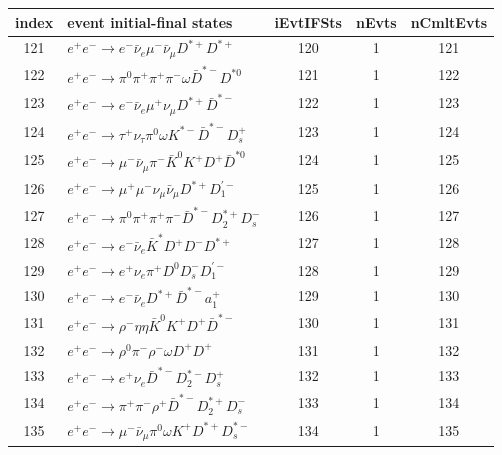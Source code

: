 \documentclass[landscape]{article}
\begin{document}
\begin{table}[htbp!]
\small
\centering
\begin{tabular}{|c|>{\centering}p{18cm}|c|c|c|}
\hline
index & event initial-final states & iEvtIFSts & nEvts & nCmltEvts \\
\hline
121 & $ e^{+} e^{-} \rightarrow e^{-} \bar{\nu}_{e} \mu^{-} \bar{\nu}_{\mu} D^{*+} D^{*+} $ & 120 & 1 & 121 \\
\hline
122 & $ e^{+} e^{-} \rightarrow \pi^{0} \pi^{+} \pi^{+} \pi^{-} \omega \bar{D}^{*-} D^{*0} $ & 121 & 1 & 122 \\
\hline
123 & $ e^{+} e^{-} \rightarrow e^{-} \bar{\nu}_{e} \mu^{+} \nu_{\mu} D^{*+} \bar{D}^{*-} $ & 122 & 1 & 123 \\
\hline
124 & $ e^{+} e^{-} \rightarrow \tau^{+} \nu_{\tau} \pi^{0} \omega K^{*-} \bar{D}^{*-} D_{s}^{+} $ & 123 & 1 & 124 \\
\hline
125 & $ e^{+} e^{-} \rightarrow \mu^{-} \bar{\nu}_{\mu} \pi^{-} \bar{K}^{0} K^{+} D^{+} \bar{D}^{*0} $ & 124 & 1 & 125 \\
\hline
126 & $ e^{+} e^{-} \rightarrow \mu^{+} \mu^{-} \nu_{\mu} \bar{\nu}_{\mu} D^{*+} D_{1}^{\prime-} $ & 125 & 1 & 126 \\
\hline
127 & $ e^{+} e^{-} \rightarrow \pi^{0} \pi^{+} \pi^{+} \pi^{-} \bar{D}^{*-} D_{2}^{*+} D_{s}^{-} $ & 126 & 1 & 127 \\
\hline
128 & $ e^{+} e^{-} \rightarrow e^{-} \bar{\nu}_{e} \bar{K}^{*} D^{+} D^{-} D^{*+} $ & 127 & 1 & 128 \\
\hline
129 & $ e^{+} e^{-} \rightarrow e^{+} \nu_{e} \pi^{+} D^{0} D_{s}^{-} D_{1}^{\prime-} $ & 128 & 1 & 129 \\
\hline
130 & $ e^{+} e^{-} \rightarrow e^{-} \bar{\nu}_{e} D^{*+} \bar{D}^{*-} a_{1}^{+} $ & 129 & 1 & 130 \\
\hline
131 & $ e^{+} e^{-} \rightarrow \rho^{-} \eta \eta \bar{K}^{0} K^{+} D^{+} \bar{D}^{*-} $ & 130 & 1 & 131 \\
\hline
132 & $ e^{+} e^{-} \rightarrow \rho^{0} \pi^{-} \rho^{-} \omega D^{+} D^{+} $ & 131 & 1 & 132 \\
\hline
133 & $ e^{+} e^{-} \rightarrow e^{+} \nu_{e} \bar{D}^{*-} D_{2}^{*-} D_{s}^{+} $ & 132 & 1 & 133 \\
\hline
134 & $ e^{+} e^{-} \rightarrow \pi^{+} \pi^{-} \rho^{+} \bar{D}^{*-} D_{2}^{*+} D_{s}^{-} $ & 133 & 1 & 134 \\
\hline
135 & $ e^{+} e^{-} \rightarrow \mu^{-} \bar{\nu}_{\mu} \pi^{0} \omega K^{+} D^{*+} D_{s}^{*-} $ & 134 & 1 & 135 \\

\end{tabular}
\end{table}
\end{document}
